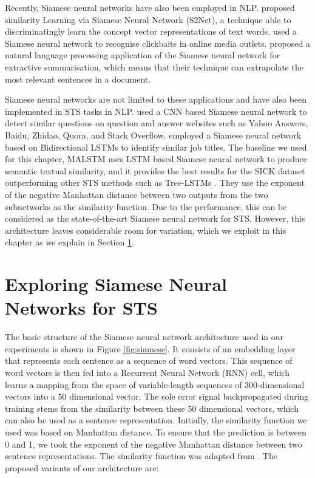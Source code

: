 Recently, Siamese neural networks have also been employed in NLP. \textcite{10.5555/2018936.2018965} proposed similarity Learning via Siamese Neural Network (S2Net), a technique able to discriminatingly learn the concept vector representations of text words. \textcite{10.1145/3209978.3210144} used a Siamese neural network to recognise clickbaits in online media outlets. \textcite{Gonzalez2019} proposed a natural language processing application of the Siamese neural network for extractive summarisation, which means that their technique can extrapolate the most relevant sentences in a document. 

Siamese neural networks are not limited to these applications and have also been implemented in STS tasks in NLP. \textcite{das-etal-2016-together} used a CNN based Siamese neural network to detect similar questions on question and answer websites such as Yahoo Answers, Baidu, Zhidao, Quora, and Stack Overflow. \textcite{neculoiu-etal-2016-learning} employed a Siamese neural network based on Bidirectional LSTMs to identify similar job titles. The baseline we used for this chapter, MALSTM \autocite{Mueller_Thyagarajan_2016} uses LSTM based Siamese neural network to produce semantic textual similarity, and it provides the best results for the SICK dataset outperforming other STS methods such as Tree-LSTMs \autocite{tai-etal-2015-improved}. They use the exponent of the negative Manhattan distance between two outputs from the two subnetworks as the similarity function. Due to the performance, this can be considered as the state-of-the-art Siamese neural network for STS. However, this architecture leaves considerable room for variation, which we exploit in this chapter as we explain in Section \ref{sec:siamese_method}.

\section{Exploring Siamese Neural Networks for STS}
\label{sec:siamese_method}

The basic structure of the Siamese neural network architecture used in our experiments is shown in Figure \ref{fig:siamese}. It consists of an embedding layer that represents each sentence as a sequence of word vectors. This sequence of word vectors is then fed into a Recurrent Neural Network (RNN) cell, which learns a mapping from the space of variable-length sequences of 300-dimensional vectors into a 50 dimensional vector. The sole error signal backpropagated during training stems from the similarity between these 50 dimensional vectors, which can also be used as a sentence representation. Initially, the similarity function we used was based on Manhattan distance. To ensure that the prediction is between 0 and 1, we took the exponent of the negative Manhattan distance between two sentence representations. The similarity function was adapted from \textcite{Mueller_Thyagarajan_2016}. The proposed variants of our architecture are:



